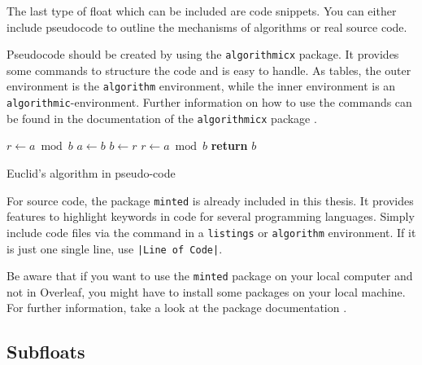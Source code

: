 \documentclass[
    language=english, %
    thesis=bachelor, %
    supervisor=postdoc, %
    multiauthor=false, %
    ]{settings/csssa-thesis}
\begin{document}
The last type of float which can be included are code snippets. You can either include pseudocode to outline the mechanisms of algorithms or real source code.

Pseudocode should be created by using the \texttt{algorithmicx} package. It provides some commands to structure the code and is easy to handle. As tables, the outer environment is the \texttt{algorithm} environment, while the inner environment is an \texttt{algorithmic}-environment. Further information on how to use the commands can be found in the documentation of the \texttt{algorithmicx} package \citep{Janos2020algorithmicx}.

\begin{algorithm}
    \begin{algorithmic}[1]
         
        \State $r\gets a\bmod b$
              \State $a\gets b$
              \State $b\gets r$
              \State $r\gets a\bmod b$
           \EndWhile\label{euclidendwhile}
           \State \textbf{return} $b$
        \EndProcedure
    \end{algorithmic}
    \caption{Euclid’s algorithm in pseudo-code}\label{ch02:code:pseudo-euclid}
\end{algorithm}

For source code, the package \texttt{minted} is already included in this thesis. It provides features to highlight keywords in code for several programming languages. Simply  include code files via the  command in a \texttt{listings} or \texttt{algorithm} environment. If it is just one single line, use \texttt{|Line of Code|}.

Be aware that if you want to use the \texttt{minted} package on your local computer and not in Overleaf, you might have to install some packages on your local machine. For further information, take a look at the package documentation \citep{Poore2020minted}.\label{ch02:sec3:minted}


\subsection{Subfloats}
\end{document}
